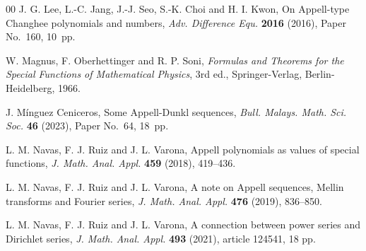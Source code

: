 \documentclass[11pt,a4paper]{amsart}
\theoremstyle{plain}
\theoremstyle{plain}
\theoremstyle{remark}
\numberwithin{equation}{section}
\begin{document}
\begin{thebibliography}{00}
J. G. Lee, L.-C. Jang, J.-J. Seo, S.-K. Choi and H. I. Kwon,
{On Appell-type Changhee polynomials and numbers},
\textit{Adv. Difference Equ.} 
\textbf{2016} (2016), Paper No.~160, 10~pp.

W. Magnus, F. Oberhettinger and R. P. Soni, 
\textit{Formulas and Theorems for the Special Functions of Mathematical Physics}, 
3rd ed., Springer-Verlag, Berlin-Heidelberg, 1966.

J. M\'inguez Ceniceros,
Some Appell-Dunkl sequences,
\textit{Bull. Malays. Math. Sci. Soc.} 
\textbf{46} (2023), Paper No.~64, 18~pp. %

L. M. Navas, F. J. Ruiz and J. L. Varona, 
Appell polynomials as values of special functions, 
\textit{J. Math. Anal. Appl.} 
\textbf{459} (2018), 419--436.

L. M. Navas, F. J. Ruiz and J. L. Varona, 
A note on Appell sequences, Mellin transforms and Fourier series, 
\textit{J. Math. Anal. Appl.} 
\textbf{476} (2019), 836--850.

L. M. Navas, F. J. Ruiz and J. L. Varona, 
A connection between power series and Dirichlet series, 
\textit{J. Math. Anal. Appl.} 
\textbf{493} (2021), article 124541, 18 pp. 





\end{thebibliography}
\end{document}
